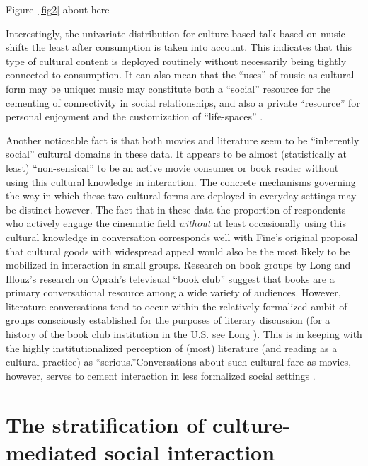 \documentclass[11pt]{article}
\begin{document}
\begin{center}
	Figure~\ref{fig2} about here
\end{center}
 
Interestingly, the univariate distribution for culture-based talk based on music shifts the least after consumption is taken into account.  This indicates that this type of cultural content is deployed routinely without necessarily being tightly connected to consumption.  It can also mean that the ``uses'' of music as cultural form may be unique:  music may constitute both a ``social'' resource for the cementing of connectivity in social relationships, and also a private ``resource'' for personal enjoyment and the customization of ``life-spaces'' \citep{denora00}.
 
Another noticeable fact is that both movies and literature seem to be ``inherently social'' cultural domains in these data.  It appears to be almost (statistically at least) ``non-sensical'' to be an active movie consumer or book reader without using this cultural knowledge in interaction.  The concrete mechanisms governing the way in which these two cultural forms are deployed in everyday settings may be distinct however. The fact that in these data the proportion of respondents who actively engage the cinematic field \emph{without} at least occasionally using this cultural knowledge in conversation corresponds well with Fine's \citeyearpar{fine77} original proposal that cultural goods with widespread appeal would also be the most likely to be mobilized in interaction in small groups. Research on book groups by Long \citeyearpar{long03} and Illouz's \citeyearpar{illouz03} research on Oprah's televisual ``book club'' suggest that books are a primary conversational resource among a wide variety of audiences.  However, literature conversations tend to occur within the relatively formalized ambit of  groups consciously established for the purposes of literary discussion (for a history of the book club institution in the U.S. see Long \citeyear{long03}).  This is in keeping with the highly institutionalized perception of (most) literature (and reading as a cultural practice) as ``serious.''Conversations about such cultural fare as movies, however, serves to cement interaction in less formalized social settings \citep{fine77}.
 
\section{The stratification of culture-mediated social interaction}
\end{document}
